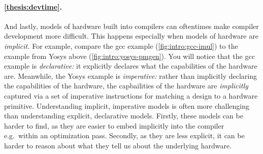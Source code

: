 \paragraph{\cref{thesis:devtime}.}
And lastly,
  models of hardware
  built into compilers
  can oftentimes make compiler development
  more difficult.
This happens especially
  when models of hardware
  are \textit{implicit.}
For example, 
  compare the gcc example (\cref{fig:intro:gcc-imul})
  to the example from
  Yosys above (\cref{fig:intro:yosys-pmgen}).
You will notice that the
  gcc example is \textit{declarative:}
  it explicitly declares
  what the capabilities of the hardware are.
Meanwhile,
  the Yosys example is \textit{imperative:}
  rather than implicitly declaring
  the capabilities of the hardware,
  the capbailities of the hardware
  are \textit{implicitly} captured
  via a set of imperative instructions
  for matching a design
  to a hardware primitive.
Understanding implicit,
  imperative models
  is often more challenging
  than understanding explicit,
  declarative models.
Firstly, these models
  can be harder to find,
  as they are easier
  to embed implicitly into the compiler
  e.g.~within an optimization pass.
Secondly, as they are less explicit,
  it can be harder to reason about
  what they tell us about the underlying hardware.
  

